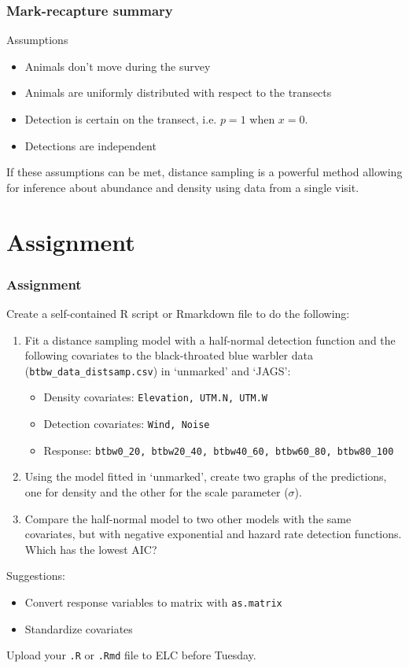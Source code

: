 \documentclass[color=usenames,dvipsnames]{beamer}\usepackage[]{graphicx}\usepackage[]{color}
\newcommand{\inr}[1]{\colorbox{inlinecolor}{\texttt{#1}}}
\begin{document}
\begin{frame}
  \frametitle{Mark-recapture summary}
  Assumptions
  \begin{itemize}
    \small
    \item Animals don't move during the survey
    \item Animals are uniformly distributed with respect to the
      transects
    \item Detection is certain on the transect, i.e. $p=1$ when $x=0$. 
    \item Detections are independent
  \end{itemize}
  \pause
  \vfill
  \small
  If these assumptions can be met, distance sampling is a powerful
  method allowing for inference about abundance and density using data
  from a single visit. \\
\end{frame}




\section{Assignment}




\begin{frame}[fragile]
  \frametitle{Assignment}
  \footnotesize
  Create a self-contained R script or Rmarkdown file to do the following:
  \vfill
  \begin{enumerate}
    \footnotesize
    \item Fit a distance sampling model with a half-normal detection
      function and the following covariates to the black-throated blue
      warbler data ({\tt btbw\_data\_distsamp.csv}) in `unmarked' and
      `JAGS':   
      \begin{itemize}
        \footnotesize
        \item Density covariates: {\tt Elevation, UTM.N, UTM.W}
        \item Detection covariates: {\tt Wind, Noise}
        \item Response: {\scriptsize \tt btbw0\_20, btbw20\_40, btbw40\_60, btbw60\_80, btbw80\_100}
      \end{itemize}
    \item Using the model fitted in `unmarked', create two graphs of
      the predictions, one for density and the other for the scale
      parameter ($\sigma$).
    \item Compare the half-normal model to two other models with the
      same covariates, but with negative exponential and hazard
      rate detection functions. Which has the lowest AIC? 
  \end{enumerate}
  \pause
  \vfill
  Suggestions:
  \begin{itemize}
    \item Convert response variables to matrix with \inr{as.matrix}
    \item Standardize covariates
  \end{itemize}
  \pause
  \vfill
  Upload your {\tt .R} or {\tt .Rmd} file to ELC before Tuesday. 
\end{frame}
\end{document}
